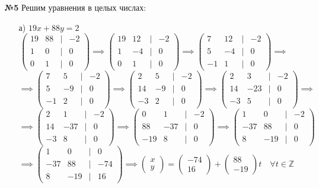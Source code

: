 \documentclass[a4paper]{article}
\newcommand{\mat}[1]{\begin{pmatrix} #1 \end{pmatrix}}
\newcommand{\ZZ}{\mathbb{Z}}
\begin{document}
\begin{enumerate}
    \item[\textbf{№5}] Решим уравнения в целых числах:
    \begin{enumerate}
        \item[а)]$19x + 88y = 2$
        $$\mat{
            19 & 88 & | & -2\\
            1 & 0 & | & 0\\
            0 & 1 & | & 0
        }\implies \mat{
            19 & 12 & | & -2\\
            1 & -4 & | & 0\\
            0 & 1 & | & 0
        }\implies \mat{
            7 & 12 & | & -2\\
            5 & -4 & | & 0\\
            -1 & 1 & | & 0
        } \implies$$
        $$\implies \mat{
            7 & 5 & | & -2\\
            5 & -9 & | & 0\\
            -1 & 2 & | & 0
        } \implies 
        \mat{
            2 & 5 & | & -2\\
            14 & -9 & | & 0\\
            -3 & 2 & | & 0
        } \implies \mat{
            2 & 3 & | & -2\\
            14 & -23 & | & 0\\
            -3 & 5 & | & 0
        } \implies$$
        $$\implies \mat{
            2 & 1 & | & -2\\
            14 & -37 & | & 0\\
            -3 & 8 & | & 0
        } \implies \mat{
            0 & 1 & | & -2\\
            88 & -37 & | & 0\\
            -19 & 8 & | & 0
        } \implies \mat{
            1 & 0 &| & -2\\
            -37 & 88&| & 0\\
            8 & -19 &| & 0
        }$$
        $$\implies \mat{
            1 & 0 &| & 0\\
            -37 & 88&| & -74\\
            8 & -19 &| & 16
        }\implies \mat{x \\ y} = \mat{-74\\16} + \mat{88 \\ -19}t \quad \forall t \in \ZZ$$
    

\end{enumerate}
\end{enumerate}
\end{document}
